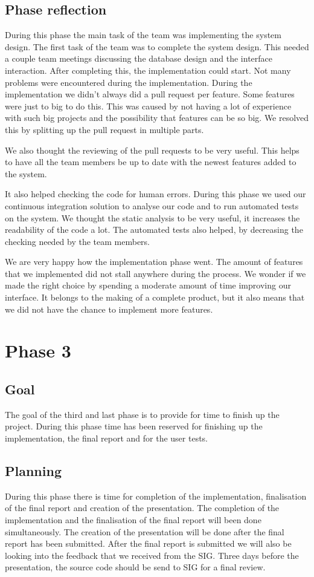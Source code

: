 \subsection{Phase reflection}
During this phase the main task of the team was implementing the system design.
The first task of the team was to complete the system design.
This needed a couple team meetings discussing the database design and the interface interaction.
After completing this, the implementation could start.
Not many problems were encountered during the implementation.
During the implementation we didn't always did a pull request per feature.
Some features were just to big to do this.
This was caused by not having a lot of experience with such big projects and the possibility that features can be so big.
We resolved this by splitting up the pull request in multiple parts.

We also thought the reviewing of the pull requests to be very useful.
This helps to have all the team members be up to date with the newest features added to the system.

It also helped checking the code for human errors.
During this phase we used our continuous integration solution to analyse our code and to run automated tests on the system.
We thought the static analysis to be very useful, it increases the readability of the code a lot.
The automated tests also helped, by decreasing the checking needed by the team members.

We are very happy how the implementation phase went.
The amount of features that we implemented did not stall anywhere during the process.
We wonder if we made the right choice by spending a moderate amount of time improving our interface.
It belongs to the making of a complete product, but it also means that we did not have the chance to implement more features.

\section{Phase 3}
\subsection{Goal}
The goal of the third and last phase is to provide for time to finish up the project.
During this phase time has been reserved for finishing up the implementation, the final report and for the user tests.

\subsection{Planning}
During this phase there is time for completion of the implementation, finalisation of the final report and creation of the presentation.
The completion of the implementation and the finalisation of the final report will been done simultaneously.
The creation of the presentation will be done after the final report has been submitted.
After the final report is submitted we will also be looking into the feedback that we received from the SIG.
Three days before the presentation, the source code should be send to SIG for a final review.

